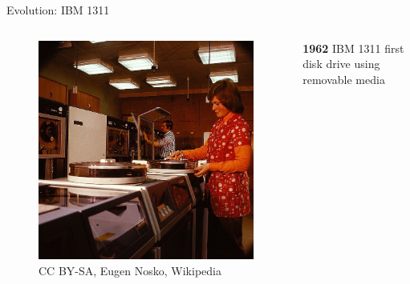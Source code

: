 \documentclass[12pt]{beamer}
\begin{document}
\begin{frame}[fragile]{Evolution: IBM 1311}
	\begin{columns}[c]
	\begin{column}[c]{.5\textwidth}	
 		\begin{figure}[c]
	 		\centering
	 		\includegraphics[width=\linewidth]{img/ibm_1311.jpg}
	 			\caption{CC BY-SA, Eugen Nosko, Wikipedia}
 		\end{figure}
 	\end{column}
 	
	\begin{column}[c]{.5\textwidth}
		\textbf{1962} IBM 1311 first disk drive using removable media
	\end{column}
	\end{columns}
\end{frame}
\end{document}
